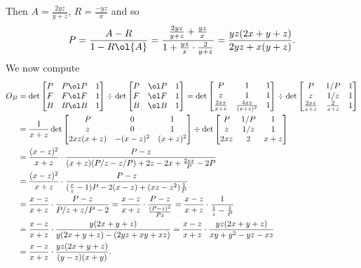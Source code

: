 \documentclass[11pt]{scrartcl}
\begin{document}
Then $A = \frac{2yz}{y+z}$,
$R = \frac{-yz}{x}$ and so
\[ P = \frac{A-R}{1-R\ol{A}}
  = \frac{\frac{2yz}{y+z} + \frac{yz}{x}}
  {1 + \frac{yz}{x} \cdot \frac{2}{y+z}}
  = \frac{yz(2x+y+z)}{2yz+x(y+z)}. \]
We now compute
\begin{align*}
  O_B &= \det \begin{bmatrix}
    P & P \ol P & 1 \\
    F & F \ol F & 1 \\
    B & B \ol B & 1
  \end{bmatrix}
  \div \det \begin{bmatrix}
    P & \ol P & 1 \\
    F & \ol F & 1 \\
    B & \ol B & 1
  \end{bmatrix}
  = \det \begin{bmatrix}
    P & 1 & 1 \\
    z & 1 & 1 \\
    \frac{2xz}{x+z} & \frac{4xz}{(x+z)^2} & 1
  \end{bmatrix}
  \div \det \begin{bmatrix}
    P & 1/P & 1 \\
    z & 1/z & 1 \\
    \frac{2xz}{x+z} & \frac{2}{x+z} & 1
  \end{bmatrix} \\
  &= \frac{1}{x+z} \det \begin{bmatrix}
    P & 0 & 1 \\
    z & 0 & 1 \\
    2xz(x+z) & -(x-z)^2 & (x+z)^2
  \end{bmatrix}
  \div \det \begin{bmatrix}
    P & 1/P & 1 \\
    z & 1/z & 1 \\
    2xz & 2 & x+z
  \end{bmatrix} \\
  &= \frac{(x-z)^2}{x+z} \cdot \frac{P-z}{(x+z)(P/z-z/P)+2z-2x + \frac{2xz}{P}-2P} \\
  &= \frac{(x-z)^2}{x+z} \cdot \frac{P-z}{
    (\frac xz-1) P - 2(x-z) + (xz-z^2) \frac 1P  } \\
  &= \frac{x-z}{x+z} \cdot \frac{P-z}{P/z + z/P - 2}
  = \frac{x-z}{x+z} \cdot \frac{P-z}{\frac{(P-z)^2}{Pz}}
  = \frac{x-z}{x+z} \cdot \frac{1}{\frac 1z - \frac 1P} \\
  &= \frac{x-z}{x+z} \cdot \frac{y(2x+y+z)}{y(2x+y+z) - (2yz+xy+xz)}
  = \frac{x-z}{x+z} \cdot \frac{yz(2x+y+z)}{xy+y^2-yz-xz} \\
  &= \frac{x-z}{x+z} \cdot \frac{yz(2x+y+z)}{(y-z)(x+y)}.
\end{align*}
\end{document}
